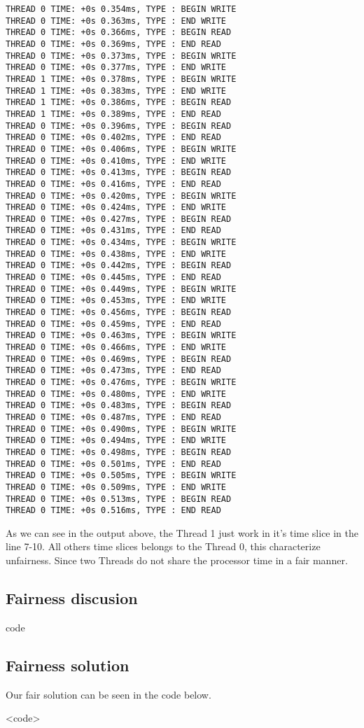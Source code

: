 \documentclass{article}
\begin{document}
\begin{lstlisting}
THREAD 0 TIME: +0s 0.354ms, TYPE : BEGIN WRITE 
THREAD 0 TIME: +0s 0.363ms, TYPE : END WRITE 
THREAD 0 TIME: +0s 0.366ms, TYPE : BEGIN READ 
THREAD 0 TIME: +0s 0.369ms, TYPE : END READ 
THREAD 0 TIME: +0s 0.373ms, TYPE : BEGIN WRITE 
THREAD 0 TIME: +0s 0.377ms, TYPE : END WRITE 
THREAD 1 TIME: +0s 0.378ms, TYPE : BEGIN WRITE 
THREAD 1 TIME: +0s 0.383ms, TYPE : END WRITE 
THREAD 1 TIME: +0s 0.386ms, TYPE : BEGIN READ 
THREAD 1 TIME: +0s 0.389ms, TYPE : END READ 
THREAD 0 TIME: +0s 0.396ms, TYPE : BEGIN READ 
THREAD 0 TIME: +0s 0.402ms, TYPE : END READ 
THREAD 0 TIME: +0s 0.406ms, TYPE : BEGIN WRITE 
THREAD 0 TIME: +0s 0.410ms, TYPE : END WRITE 
THREAD 0 TIME: +0s 0.413ms, TYPE : BEGIN READ 
THREAD 0 TIME: +0s 0.416ms, TYPE : END READ 
THREAD 0 TIME: +0s 0.420ms, TYPE : BEGIN WRITE 
THREAD 0 TIME: +0s 0.424ms, TYPE : END WRITE 
THREAD 0 TIME: +0s 0.427ms, TYPE : BEGIN READ 
THREAD 0 TIME: +0s 0.431ms, TYPE : END READ 
THREAD 0 TIME: +0s 0.434ms, TYPE : BEGIN WRITE 
THREAD 0 TIME: +0s 0.438ms, TYPE : END WRITE 
THREAD 0 TIME: +0s 0.442ms, TYPE : BEGIN READ 
THREAD 0 TIME: +0s 0.445ms, TYPE : END READ 
THREAD 0 TIME: +0s 0.449ms, TYPE : BEGIN WRITE 
THREAD 0 TIME: +0s 0.453ms, TYPE : END WRITE 
THREAD 0 TIME: +0s 0.456ms, TYPE : BEGIN READ 
THREAD 0 TIME: +0s 0.459ms, TYPE : END READ 
THREAD 0 TIME: +0s 0.463ms, TYPE : BEGIN WRITE 
THREAD 0 TIME: +0s 0.466ms, TYPE : END WRITE 
THREAD 0 TIME: +0s 0.469ms, TYPE : BEGIN READ 
THREAD 0 TIME: +0s 0.473ms, TYPE : END READ 
THREAD 0 TIME: +0s 0.476ms, TYPE : BEGIN WRITE 
THREAD 0 TIME: +0s 0.480ms, TYPE : END WRITE 
THREAD 0 TIME: +0s 0.483ms, TYPE : BEGIN READ 
THREAD 0 TIME: +0s 0.487ms, TYPE : END READ 
THREAD 0 TIME: +0s 0.490ms, TYPE : BEGIN WRITE 
THREAD 0 TIME: +0s 0.494ms, TYPE : END WRITE 
THREAD 0 TIME: +0s 0.498ms, TYPE : BEGIN READ 
THREAD 0 TIME: +0s 0.501ms, TYPE : END READ 
THREAD 0 TIME: +0s 0.505ms, TYPE : BEGIN WRITE 
THREAD 0 TIME: +0s 0.509ms, TYPE : END WRITE 
THREAD 0 TIME: +0s 0.513ms, TYPE : BEGIN READ 
THREAD 0 TIME: +0s 0.516ms, TYPE : END READ
\end{lstlisting}

As we can see in the output above, the Thread 1 just work in it's time slice in the line 7-10. All
others time slices belongs to the Thread 0, this characterize unfairness. Since two Threads do not
share the processor time in a fair manner.

\subsection{Fairness discusion}

code

\subsection{Fairness solution}

Our fair solution can be seen in the code below.

<code>
\end{document}
